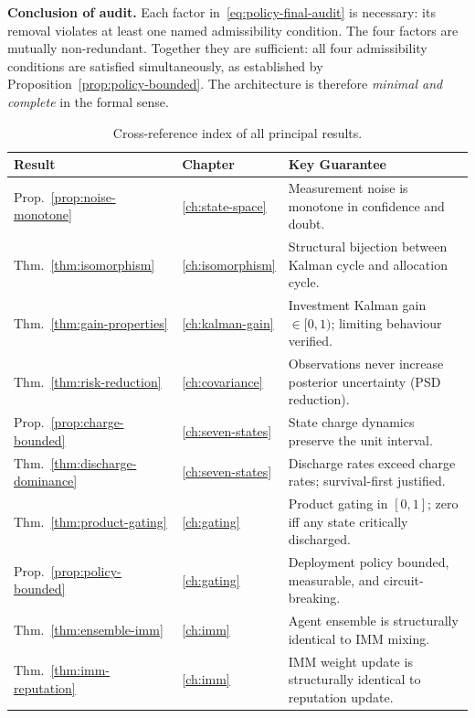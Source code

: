 \documentclass[12pt,openany]{book}
\numberwithin{equation}{chapter}
\theoremstyle{plain}
\theoremstyle{definition}
\theoremstyle{remark}
\begin{document}
\noindent
\textbf{Conclusion of audit.}
Each factor in~\eqref{eq:policy-final-audit} is necessary: its
removal violates at least one named admissibility condition.  The
four factors are mutually non-redundant.  Together they are
sufficient: all four admissibility conditions are satisfied
simultaneously, as established by
Proposition~\ref{prop:policy-bounded}.  The architecture is
therefore \emph{minimal and complete} in the formal sense.


\begin{table}[H]
\centering
\caption{Cross-reference index of all principal results.}
\label{tab:summary}
\small
\begin{tabularx}{\linewidth}{@{} l l X @{}}
\toprule
\textbf{Result} & \textbf{Chapter} & \textbf{Key Guarantee} \\
\midrule
Prop.~\ref{prop:noise-monotone}
  & \ref{ch:state-space}
  & Measurement noise is monotone in confidence and doubt. \\
Thm.~\ref{thm:isomorphism}
  & \ref{ch:isomorphism}
  & Structural bijection between Kalman cycle and allocation cycle. \\
Thm.~\ref{thm:gain-properties}
  & \ref{ch:kalman-gain}
  & Investment Kalman gain $\in [0,1)$; limiting behaviour verified. \\
Thm.~\ref{thm:risk-reduction}
  & \ref{ch:covariance}
  & Observations never increase posterior uncertainty (PSD reduction). \\
Prop.~\ref{prop:charge-bounded}
  & \ref{ch:seven-states}
  & State charge dynamics preserve the unit interval. \\
Thm.~\ref{thm:discharge-dominance}
  & \ref{ch:seven-states}
  & Discharge rates exceed charge rates; survival-first justified. \\
Thm.~\ref{thm:product-gating}
  & \ref{ch:gating}
  & Product gating in $[0,1]$; zero iff any state critically discharged. \\
Prop.~\ref{prop:policy-bounded}
  & \ref{ch:gating}
  & Deployment policy bounded, measurable, and circuit-breaking. \\
Thm.~\ref{thm:ensemble-imm}
  & \ref{ch:imm}
  & Agent ensemble is structurally identical to IMM mixing. \\
Thm.~\ref{thm:imm-reputation}
  & \ref{ch:imm}
  & IMM weight update is structurally identical to reputation update. \\

\end{tabularx}
\end{table}
\end{document}
